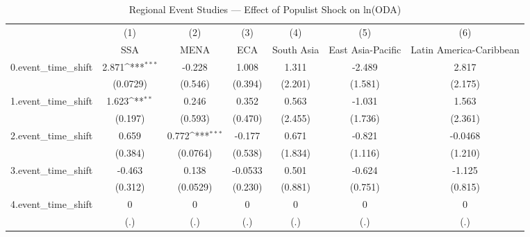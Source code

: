 \begin{table}[htbp]\centering
\def\sym#1{\ifmmode^{#1}\else\(^{#1}\)\fi}
\caption{Regional Event Studies — Effect of Populist Shock on ln(ODA)}
\begin{tabular}{l*{6}{c}}
\toprule
            &\multicolumn{1}{c}{(1)}&\multicolumn{1}{c}{(2)}&\multicolumn{1}{c}{(3)}&\multicolumn{1}{c}{(4)}&\multicolumn{1}{c}{(5)}&\multicolumn{1}{c}{(6)}\\
            &\multicolumn{1}{c}{SSA}&\multicolumn{1}{c}{MENA}&\multicolumn{1}{c}{ECA}&\multicolumn{1}{c}{South Asia}&\multicolumn{1}{c}{East Asia-Pacific}&\multicolumn{1}{c}{Latin America-Caribbean}\\
\midrule
0.event\_time\_shift&       2.871\sym{***}&      -0.228         &       1.008         &       1.311         &      -2.489         &       2.817         \\
            &    (0.0729)         &     (0.546)         &     (0.394)         &     (2.201)         &     (1.581)         &     (2.175)         \\
\addlinespace
1.event\_time\_shift&       1.623\sym{**} &       0.246         &       0.352         &       0.563         &      -1.031         &       1.563         \\
            &     (0.197)         &     (0.593)         &     (0.470)         &     (2.455)         &     (1.736)         &     (2.361)         \\
\addlinespace
2.event\_time\_shift&       0.659         &       0.772\sym{***}&      -0.177         &       0.671         &      -0.821         &     -0.0468         \\
            &     (0.384)         &    (0.0764)         &     (0.538)         &     (1.834)         &     (1.116)         &     (1.210)         \\
\addlinespace
3.event\_time\_shift&      -0.463         &       0.138         &     -0.0533         &       0.501         &      -0.624         &      -1.125         \\
            &     (0.312)         &    (0.0529)         &     (0.230)         &     (0.881)         &     (0.751)         &     (0.815)         \\
\addlinespace
4.event\_time\_shift&           0         &           0         &           0         &           0         &           0         &           0         \\
            &         (.)         &         (.)         &         (.)         &         (.)         &         (.)         &         (.)         \\

\end{tabular}
\end{table}
